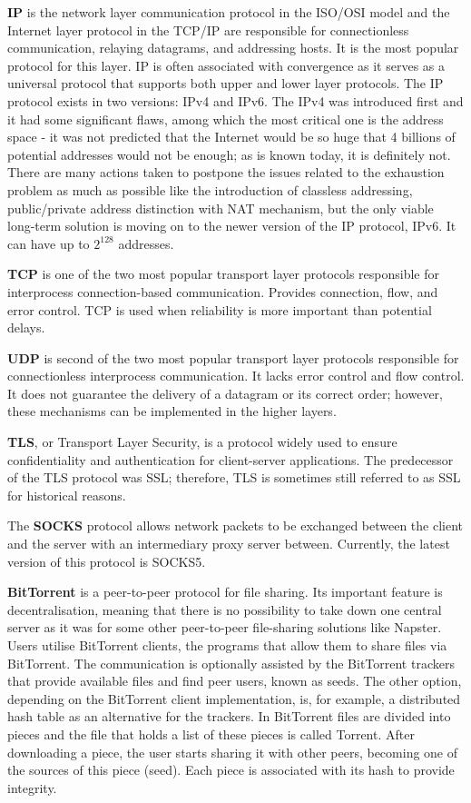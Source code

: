 \textbf{IP} is the network layer communication protocol in the ISO/OSI model and the Internet layer protocol in the TCP/IP are responsible for connectionless communication, relaying datagrams, and addressing hosts. It is the most popular protocol for this layer. IP is often associated with convergence as it serves as a universal protocol that supports both upper and lower layer protocols. The IP protocol exists in two versions: IPv4 and IPv6. The IPv4 was introduced first and it had some significant flaws, among which the most critical one is the address space - it was not predicted that the Internet would be so huge that 4 billions of potential addresses would not be enough; as is known today, it is definitely not. There are many actions taken to postpone the issues related to the exhaustion problem as much as possible like the introduction of classless addressing, public/private address distinction with NAT mechanism, but the only viable long-term solution is moving on to the newer version of the IP protocol, IPv6. It can have up to $2^{128}$ addresses.

\textbf{TCP} is one of the two most popular transport layer protocols responsible for interprocess connection-based communication. Provides connection, flow, and error control. TCP is used when reliability is more important than potential delays.

\textbf{UDP} is second of the two most popular transport layer protocols responsible for connectionless interprocess communication. It lacks error control and flow control. It does not guarantee the delivery of a datagram or its correct order; however, these mechanisms can be implemented in the higher layers.

\textbf{TLS}, or Transport Layer Security, is a protocol widely used to ensure confidentiality and authentication for client-server applications. The predecessor of the TLS protocol was SSL; therefore, TLS is sometimes still referred to as SSL for historical reasons. 

The \textbf{SOCKS} protocol allows network packets to be exchanged between the client and the server with an intermediary proxy server between. Currently, the latest version of this protocol is SOCKS5.

\textbf{BitTorrent} is a peer-to-peer protocol for file sharing. Its important feature is decentralisation, meaning that there is no possibility to take down one central server as it was for some other peer-to-peer file-sharing solutions like Napster. Users utilise BitTorrent clients, the programs that allow them to share files via BitTorrent. The communication is optionally assisted by the BitTorrent trackers that provide available files and find peer users, known as seeds. The other option, depending on the BitTorrent client implementation, is, for example, a distributed hash table as an alternative for the trackers. In BitTorrent files are divided into pieces and the file that holds a list of these pieces is called Torrent. After downloading a piece, the user starts sharing it with other peers, becoming one of the sources of this piece (seed). Each piece is associated with its hash to provide integrity.

